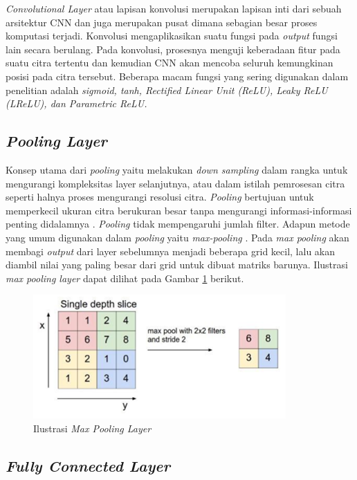 \textit{Convolutional Layer} atau lapisan konvolusi merupakan lapisan inti dari sebuah arsitektur CNN dan juga merupakan pusat dimana sebagian besar proses komputasi terjadi. Konvolusi mengaplikasikan suatu fungsi pada \textit{output} fungsi lain secara berulang. Pada konvolusi, prosesnya menguji keberadaan fitur pada suatu citra tertentu dan kemudian CNN akan mencoba seluruh kemungkinan posisi pada citra tersebut. Beberapa macam fungsi yang sering digunakan dalam penelitian adalah \textit{sigmoid, tanh, Rectified Linear Unit (ReLU), Leaky ReLU (LReLU), \textnormal{dan} Parametric ReLU.}

\subsection{\textit{Pooling Layer}}
\label{subsec:poolinglayer}

Konsep utama dari \textit{pooling} yaitu melakukan \textit{down sampling} dalam rangka untuk mengurangi kompleksitas layer selanjutnya, atau dalam istilah pemrosesan citra seperti halnya proses mengurangi resolusi citra. \textit{Pooling} bertujuan untuk memperkecil ukuran citra berukuran besar tanpa mengurangi informasi-informasi penting didalamnya \citep*{Pangestu2018-mq}. \textit{Pooling} tidak mempengaruhi jumlah filter. Adapun metode yang umum digunakan dalam \textit{pooling} yaitu \textit{max-pooling} \citep*{8308186}. Pada \textit{max pooling} akan membagi \textit{output} dari layer sebelumnya menjadi beberapa grid kecil, lalu akan diambil nilai yang paling besar dari grid untuk dibuat matriks barunya. Ilustrasi \textit{max pooling layer} dapat dilihat pada Gambar \ref*{fig:poolinglayer} berikut.

\begin{figure}[H]
    \centering
    \includegraphics[scale=0.9]{gambar/poolinglayer.png}
    \caption{Ilustrasi \textit{Max Pooling Layer} \citep*{poolinglayer}}
    \label{fig:poolinglayer}
\end{figure}

\subsection{\textit{Fully Connected Layer}}
\label{subsec:fullyconnectedlayer}


